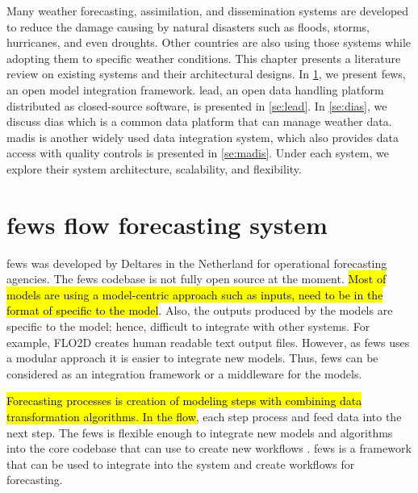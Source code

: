 Many weather forecasting, assimilation, and dissemination systems are developed to reduce the damage causing by natural disasters such as floods, storms, hurricanes, and even droughts.
Other countries are also using those systems while adopting them to specific weather conditions.
This chapter presents a literature review on existing systems and their architectural designs. In \cref{se:fews}, we present \acrfull{fews}, an open model integration framework. \acrfull{lead}, an open data handling platform distributed as closed-source software, is presented in \cref{se:lead}.
In \cref{se:dias}, we discuss \acrfull{dias} which is a common data platform that can manage weather data. \acrfull{madis} is another widely used data integration system, which also provides data access with quality controls is presented in \cref{se:madis}. Under each system, we explore their system architecture, scalability, and flexibility.


\section{\acrshort{fews} flow forecasting system}
\label{se:fews}

\acrshort{fews} \cite{Werner2013TheSystem} was developed by Deltares in the Netherland for operational forecasting agencies. The \acrshort{fews} codebase is not fully open source at the moment.
\hl{Most of models are using a model-centric approach such as inputs, need to be in the format of specific to the model}. Also, the outputs produced by the models are specific to the model; hence, difficult to integrate with other systems. For example, FLO2D creates human readable text output files. However, as \acrshort{fews} uses a modular approach it is easier to integrate new models. 
Thus, \acrshort{fews} can be considered as an integration framework or a middleware for the models.

\hl{Forecasting processes is creation of modeling steps with combining data transformation algorithms. In the flow}, each step process and feed data into the next step. The \acrshort{fews} is flexible enough to integrate new models and algorithms into the core codebase that can use to create new workflows \cite{Werner2013TheSystem}. %
\acrshort{fews} is a framework that can be used to integrate into the system and create workflows for forecasting.

